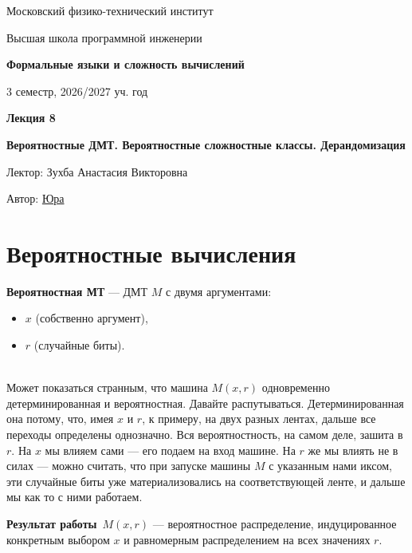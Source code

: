 \documentclass[11pt]{article}
\newcommand{\lectureNumber}{8}
\newcommand{\lectureTitle}{Вероятностные ДМТ. Вероятностные сложностные классы. Дерандомизация}
\newcommand{\courseName}{Формальные языки и сложность вычислений}
\newcommand{\semester}{3 семестр, 2026/2027 уч. год}
\begin{document}
\begin{titlepage}
    \centering
    
    {\large Московский физико-технический институт \par}
    {\large Высшая школа программной инженерии \par}
    \vspace{2cm}

    {\Large \textbf{\courseName} \par}
    {\large \semester \par}
    
    \vspace*{\fill}

    {\Huge \textbf{Лекция \lectureNumber} \par}
    {\Huge \textbf{\lectureTitle} \par}
    
    \vspace*{\fill}
    
    {\large Лектор: Зухба Анастасия Викторовна \par}
    {\large Автор: \href{https://t.me/ceagest}{Юра} \par}

\end{titlepage}


\section{Вероятностные вычисления}

\begin{definition}
    \textbf{Вероятностная МТ} --- ДМТ $M$ с двумя аргументами:
    \begin{itemize}
        \item $x$ (собственно аргумент),
        \item $r$ (случайные биты).
    \end{itemize}
\end{definition} \leavevmode
\\
Может показаться странным, что машина $M(x, r)$ одновременно детерминированная и вероятностная. Давайте распутываться.
Детерминированная она потому, что, имея $x$ и $r$, к примеру, на двух разных лентах, дальше все переходы определены однозначно. Вся вероятностность, на самом деле, зашита в $r$. На $x$ мы влияем сами --- его подаем на вход машине. На $r$ же мы влиять не в силах --- можно считать, что при запуске машины $M$ с указанным нами иксом, эти случайные биты уже материализовались на соответствующей ленте, и дальше мы как то с ними работаем.
\begin{definition}
    \textbf{Результат работы} $\,M(x, r)$ --- вероятностное распределение, индуцированное конкретным выбором $x$ и равномерным распределением на всех значениях $r$.
\end{definition}
\end{document}
